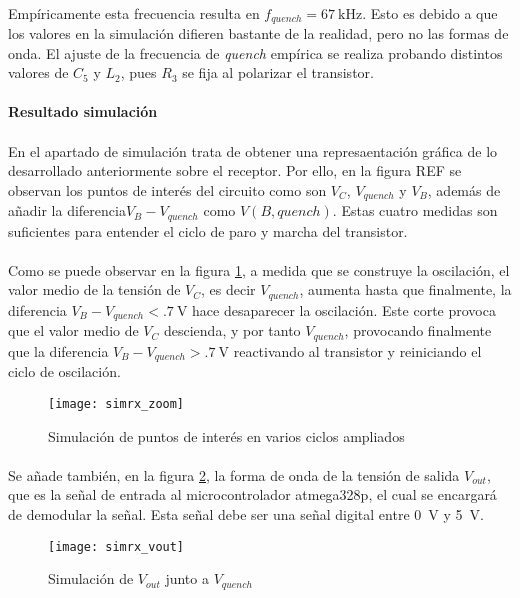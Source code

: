 \paragraph{}
Empíricamente esta frecuencia resulta en $f_{quench} = \SI{67}{\kilo\hertz}$. Esto es debido a que los valores en la simulación difieren bastante de la realidad, pero no las formas de onda. El ajuste de la frecuencia de \textit{quench} empírica se realiza probando distintos valores de $C_5$ y $L_2$, pues $R_3$ se fija al polarizar el transistor.

\paragraph{Resultado simulaci\'on} 
\paragraph{}
En el apartado de simulación trata de obtener una represaentación gráfica de lo desarrollado anteriormente sobre el receptor. Por ello, en la figura REF se observan los puntos de interés del circuito como son $V_C$, $V_{quench}$ y $V_{B}$, además de añadir la diferencia$V_B - V_{quench}$ como $V(B,quench)$. Estas cuatro medidas son suficientes para entender el ciclo de paro y marcha del transistor.
\paragraph{}
Como se puede observar en la figura \ref{fig:simrx_zoom}, a medida que se construye la oscilación, el valor medio de la tensión de $V_{C}$, es decir $V_{quench}$, aumenta hasta que finalmente, la diferencia $V_B - V_{quench} < \SI{.7}{\volt}$ hace desaparecer la oscilaci\'on. Este corte provoca que el valor medio de $V_C$ descienda, y por tanto $V_{quench}$, provocando finalmente que la diferencia $V_B - V_{quench} > \SI{.7}{\volt}$ reactivando al transistor y reiniciando el ciclo de oscilaci\'on.

\begin{figure}[h!]
    \centering
    \texttt{[image: simrx\_zoom]}
    \caption{Simulación de puntos de interés en varios ciclos ampliados}
    \label{fig:simrx_zoom}
\end{figure}

\paragraph{}
Se añade también, en la figura \ref{fig:simrx_vout}, la forma de onda de la tensión de salida $V_{out}$, que es la señal de entrada al microcontrolador atmega328p, el cual se encargará de demodular la señal. Esta señal debe ser una señal digital entre \SI{0}{\volt} y \SI{5}{\volt}.
\begin{figure}[h!]
    \centering
    \texttt{[image: simrx\_vout]}
    \caption{Simulación de $V_{out}$ junto a $V_{quench}$}
    \label{fig:simrx_vout}
\end{figure}

